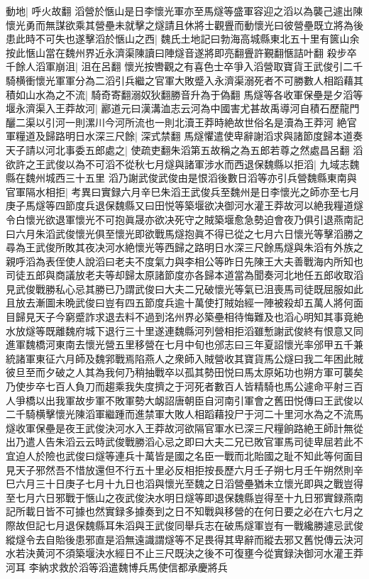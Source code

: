 動地|{
	呼火故翻}
滔營於愜山是日李懷光軍亦至馬燧等盛軍容迎之滔以為襲己遽出陳懷光勇而無謀欲乘其營壘未就擊之燧請且休將士觀舋而動懷光曰彼營壘既立將為後患此時不可失也遂擊滔於愜山之西|{
	魏氏土地記曰勃海高城縣東北五十里有篋山余按此愜山當在魏州界近永濟渠陳讀曰陣燧音遂將即亮翻舋許覲翻愜詰叶翻}
殺步卒千餘人滔軍崩沮|{
	沮在呂翻}
懷光按轡觀之有喜色士卒爭入滔營取寶貨王武俊引二千騎横衝懷光軍軍分為二滔引兵繼之官軍大敗蹙入永濟渠溺死者不可勝數人相蹈藉其積如山水為之不流|{
	騎奇寄翻溺奴狄翻勝音升為于偽翻}
馬燧等各收軍保壘是夕滔等堰永濟渠入王莽故河|{
	酈道元曰漢溝洫志云河為中國害尤甚故禹導河自積石歷龍門釃二渠以引河一則漯川今河所流也一則北瀆王莽時絶故世俗名是瀆為王莽河}
絶官軍糧道及歸路明日水深三尺餘|{
	深式禁翻}
馬燧懼遣使卑辭謝滔求與諸節度歸本道奏天子請以河北事委五郎處之|{
	使疏吏翻朱滔第五故稱之為五郎若尊之然處昌呂翻}
滔欲許之王武俊以為不可滔不從秋七月燧與諸軍涉水而西退保魏縣以拒滔|{
	九域志魏縣在魏州城西三十五里}
滔乃謝武俊武俊由是恨滔後數日滔等亦引兵營魏縣東南與官軍隔水相拒|{
	考異曰實録六月辛巳朱滔王武俊兵至魏州是日李懷光之師亦至七月庚子馬燧等四節度兵退保魏縣又曰田悦等築堰欲决御河水灌王莽故河以絶我糧道燧令白懷光欲退軍懷光不可抱眞晟亦欲决死守之賊築堰愈急勢迫會夜乃俱引退燕南記曰六月朱滔武俊懷光俱至懷光即欲戰馬燧抱眞不得已從之七月六日懷光等擊滔勝之尋為王武俊所敗其夜决河水絶懷光等西歸之路明日水深三尺餘馬燧與朱滔有外族之親呼滔為表侄使人說滔曰老夫不度氣力與李相公等昨日先陳王大夫善戰海内所知也司徒五郎與商議放老夫等却歸太原諸節度亦各歸本道當為聞奏河北地任五郎收取滔見武俊戰勝私心忌其勝已乃謂武俊曰大夫二兄破懷光等氣已沮喪馬司徒既屈服如此且放去漸圖未晩武俊曰豈有四五節度兵逾十萬使打賊始經一陣被殺却五萬人將何面目歸見天子今窮蹙詐求退去料不過到洺州界必築壘相待悔難及也滔心明知其事竟絶水放燧等既離魏府城下退行三十里遂連魏縣河列營相拒滔雖慙謝武俊終有恨意又同進軍魏橋河東南去懷光營五里移營在七月中旬也邠志曰三年夏詔懷光率邠甲五千兼統諸軍東征六月師及魏郛戰焉陷燕人之衆師入賊營收其寶貨馬公燧曰我二年困此賊彼旦至而夕破之人其為我何乃稍抽戰卒以孤其勢田悦曰馬太原妬功也朔方軍可襲矣乃使步卒七百人負刀而趨乘我失度擠之于河死者數百人皆精騎也馬公遽命平射三百人爭橋以出我軍故步軍不敗軍勢大衂詔唐朝臣自河南引軍會之舊田悦傳曰王武俊以二千騎横擊懷光陳滔軍繼踵而進禁軍大敗人相蹈藉投尸于河二十里河水為之不流馬燧收軍保壘是夜王武俊決河水入王莽故河欲隔官軍水已深三尺糧餉路絶王師計無從出乃遣人告朱滔云云時武俊戰勝滔心忌之即曰大夫二兄已敗官軍馬司徒卑屈若此不宜迫人於險也武俊曰燧等連兵十萬皆是國之名臣一戰而北貽國之耻不知此等何面目見天子邪然吾不惜放還但不行五十里必反相拒按長歷六月壬子朔七月壬午朔然則辛巳六月三十日庚子七月十九日也滔與懷光至魏之日滔營壘猶未立懷光即與之戰豈得至七月六日邪戰于愜山之夜武俊決水明日燧等即退保魏縣豈得至十九日邪實録燕南記所載日皆不可據也然實録多據奏到之日不知戰與移營的在何日要之必在六七月之際故但記七月退保魏縣耳朱滔與王武俊同舉兵志在破馬燧軍豈有一戰纔勝遽忌武俊縱燧令去自貽後患邪直是滔無遠識謂燧等不足畏得其卑辭而縱去邪又舊悦傳云決河水若決黄河不須築堰決水經日不止三尺既決之後不可復壅今從實録決御河水灌王莽河耳}
李納求救於滔等滔遣魏博兵馬使信都承慶將兵

